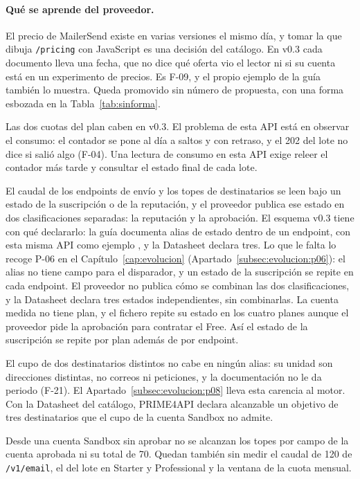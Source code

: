 \paragraph{Qué se aprende del proveedor.}
El precio de MailerSend existe en varias versiones el mismo día, y tomar la que
dibuja \texttt{/pricing} con JavaScript es una decisión del catálogo. En v0.3 cada
documento lleva una fecha, que no dice qué oferta vio el lector ni si su cuenta está
en un experimento de precios. Es F-09, y el propio ejemplo de la guía
también lo muestra. Queda promovido sin número de propuesta, con una
forma esbozada en la Tabla~\ref{tab:sinforma}.

Las dos cuotas del plan caben en v0.3. El problema de esta API está en observar el consumo:
el contador se pone al día a saltos y con retraso, y el 202 del lote no dice si salió
algo (F-04). Una lectura de consumo en esta API exige releer el contador más tarde y
consultar el estado final de cada lote.

El caudal de los endpoints de envío y los topes de destinatarios se leen bajo un estado
de la suscripción o de la reputación, y el proveedor publica ese estado en dos clasificaciones separadas: la
reputación y la aprobación.
El esquema v0.3 tiene con qué declararlo: la guía documenta alias de estado dentro de
un endpoint, con esta misma API como ejemplo \citep{apisconsumptionmodel}, y la
Datasheet declara tres. Lo que le falta lo recoge P-06 en el
Capítulo~\ref{cap:evolucion} (Apartado~\ref{subsec:evolucion:p06}): el alias no tiene
campo para el disparador, y un estado de la suscripción se repite en cada endpoint. El
proveedor no publica cómo se combinan las dos clasificaciones, y la Datasheet declara
tres estados independientes, sin combinarlas. La cuenta medida no tiene plan, y el
fichero repite su estado en los cuatro planes aunque el proveedor pide la aprobación
para contratar el Free. Así el estado de la suscripción se repite por plan además de por endpoint.

El cupo de dos destinatarios distintos no cabe en ningún alias: su unidad son
direcciones distintas, no correos ni peticiones, y la documentación no le da periodo
(F-21). El
Apartado~\ref{subsec:evolucion:p08} lleva esta carencia al motor. Con la Datasheet del
catálogo, PRIME4API declara alcanzable un objetivo de tres destinatarios que el cupo
de la cuenta Sandbox no admite.

Desde una cuenta Sandbox sin aprobar no se alcanzan los topes por campo de la cuenta
aprobada ni su total de 70. Quedan también sin
medir el caudal de 120 de \texttt{/v1/email}, el del lote en Starter y Professional y
la ventana de la cuota mensual.

